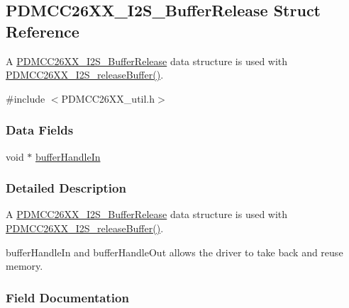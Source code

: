 \subsection{P\+D\+M\+C\+C26\+X\+X\+\_\+\+I2\+S\+\_\+\+Buffer\+Release Struct Reference}
\label{struct_p_d_m_c_c26_x_x___i2_s___buffer_release}


A \hyperlink{struct_p_d_m_c_c26_x_x___i2_s___buffer_release}{P\+D\+M\+C\+C26\+X\+X\+\_\+\+I2\+S\+\_\+\+Buffer\+Release} data structure is used with \hyperlink{_p_d_m_c_c26_x_x__util_8h_ae6436840c3944258d3bdf041250dd10c}{P\+D\+M\+C\+C26\+X\+X\+\_\+\+I2\+S\+\_\+release\+Buffer()}.  




{\ttfamily \#include $<$P\+D\+M\+C\+C26\+X\+X\+\_\+util.\+h$>$}

\subsubsection*{Data Fields}
\begin{DoxyCompactItemize}
\item 
void $\ast$ \hyperlink{struct_p_d_m_c_c26_x_x___i2_s___buffer_release_aba73b8ce3a0b12b652c0078ad6cf2169}{buffer\+Handle\+In}
\end{DoxyCompactItemize}


\subsubsection{Detailed Description}
A \hyperlink{struct_p_d_m_c_c26_x_x___i2_s___buffer_release}{P\+D\+M\+C\+C26\+X\+X\+\_\+\+I2\+S\+\_\+\+Buffer\+Release} data structure is used with \hyperlink{_p_d_m_c_c26_x_x__util_8h_ae6436840c3944258d3bdf041250dd10c}{P\+D\+M\+C\+C26\+X\+X\+\_\+\+I2\+S\+\_\+release\+Buffer()}. 

buffer\+Handle\+In and buffer\+Handle\+Out allows the driver to take back and reuse memory. 

\subsubsection{Field Documentation}

